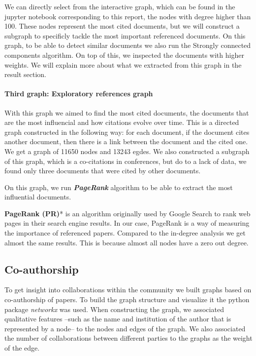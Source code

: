 \documentclass[article,twocolumn]{IEEEtran}
\begin{document}
    We can directly select from the interactive graph, which can be found in
the jupyter notebook corresponding to this report, the nodes with degree
higher than 100. These nodes represent the most cited documents, but we
will construct a subgraph to specificly tackle the most important
referenced documents. On this graph, to be able to detect similar
documents we also run the Strongly connected components algorithm. On
top of this, we inspected the documents with higher weights. We will
explain more about what we extracted from this graph in the result
section.

    \hypertarget{third-graph-exploratory-references-graph}{%
\paragraph{Third graph: Exploratory references
graph}\label{third-graph-exploratory-references-graph}}

With this graph we aimed to find the most cited documents, the documents
that are the most influencial and how citations evolve over time. This
is a directed graph constructed in the following way: for each document,
if the document cites another document, then there is a link between the
document and the cited one. We get a graph of 11650 nodes and 13243
egdes. We also constructed a subgraph of this graph, which is a
co-citations in conferences, but do to a lack of data, we found only
three documents that were cited by other documents.

On this graph, we run \textbf{\emph{PageRank}} algorithm to be able to
extract the most influential documents.

\textbf{PageRank (PR)}* is an algorithm originally used by Google Search
to rank web pages in their search engine results. In our case, PageRank
is a way of measuring the importance of referenced papers. Compared to
the in-degree analysis we get almost the same results. This is because
almost all nodes have a zero out degree.



    \hypertarget{co-authorship}{%
\subsection{Co-authorship}\label{co-authorship}}

To get insight into collaborations within the community we built graphs
based on co-authorship of papers. To build the graph structure and
visualize it the python package \emph{networkx} was used. When
constructing the graph, we associated qualitative features --such as the
name and institution of the author that is represented by a node-- to
the nodes and edges of the graph. We also associated the number of
collaborations between different parties to the graphs as the weight of
the edge.
\end{document}
